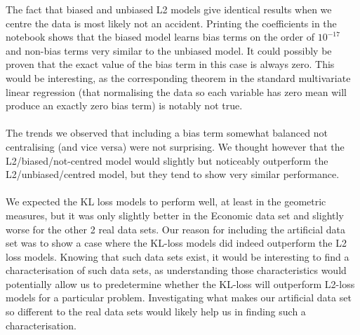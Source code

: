 \documentclass[BSc]{usydthesis}
\numberwithin{equation}{chapter}
\theoremstyle{remark}
\begin{document}
The fact that biased and unbiased L2 models give identical results when we centre the data is most likely not an accident. Printing the coefficients in the notebook shows that the biased model learns bias terms on the order of  $10^{-17}$ and non-bias terms very similar to the unbiased model. It could possibly be proven that the exact value of the bias term in this case is always zero. This would be interesting, as the corresponding theorem in the standard multivariate linear regression (that normalising the data so each variable has zero mean will produce an exactly zero bias term) is notably not true.\\
\\
The trends we observed that including a bias term somewhat balanced not centralising (and vice versa) were not surprising. We thought however that the L2/biased/not-centred model would slightly but noticeably outperform the L2/unbiased/centred model, but they tend to show very similar performance.\\
\\
We expected the KL loss models to perform well, at least in the geometric measures, but it was only slightly better in the Economic data set and slightly worse for the other 2 real data sets. Our reason for including the artificial data set was to show a case where the KL-loss models did indeed outperform the L2 loss models. Knowing that such data sets exist, it would be interesting to find a characterisation of such data sets, as understanding those characteristics would potentially allow us to predetermine whether the KL-loss will outperform L2-loss models for a particular problem. Investigating what makes our artificial data set so different to the real data sets would likely help us in finding such a characterisation.\\
\end{document}
